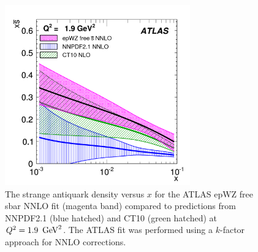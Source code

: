 \begin{itemize}
\begin{figure}[!ht]
  \centering
  \includegraphics[width=8cm]{atlas.pdf}
  \caption{The strange antiquark density versus $x$ for the ATLAS
    epWZ free sbar NNLO fit \cite{atlas:strange} (magenta band) compared to predictions
    from NNPDF2.1 (blue hatched) and CT10 (green hatched) 
    at $Q^2 = 1.9\ \,\text{Ge\hspace{-.08em}V}^2$. The ATLAS fit was performed using a $k$-factor approach 
    for NNLO corrections.}
  \label{fig:atlas}
\end{figure}

\end{itemize}


